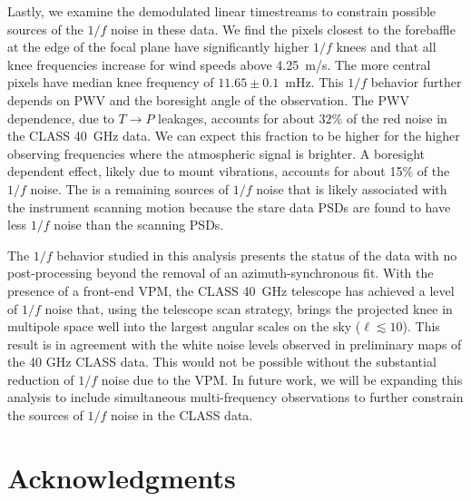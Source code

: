 \documentclass[twocolumn, tighten, numberedappendix, twocolappendix]{aastex63}
\begin{document}
Lastly, we examine the demodulated linear timestreams to constrain possible sources of the $1/f$ noise in these data. We find the pixels closest to the forebaffle at the edge of the focal plane have significantly higher $1/f$ knees and that all knee frequencies increase for wind speeds above 4.25~m/s. The more central pixels have median knee frequency of $11.65\pm0.1$~mHz. This $1/f$ behavior further depends on PWV and the boresight angle of the observation. The PWV dependence, due to $T\rightarrow P$ leakages, accounts for about $32\%$ of the red noise in the CLASS 40~GHz data. We can expect this fraction to be higher for the higher observing frequencies where the atmospheric signal is brighter. A boresight dependent effect, likely due to mount vibrations, accounts for about 15\% of the $1/f$ noise. The is a remaining sources of $1/f$ noise that is likely associated with the instrument scanning motion because the stare data PSDs are found to have less $1/f$ noise than the scanning PSDs.


The $1/f$ behavior studied in this analysis presents the status of the data with no post-processing beyond the removal of an azimuth-synchronous fit. With the presence of a front-end VPM, the CLASS 40~GHz telescope has achieved a level of $1/f$ noise that, using the telescope scan strategy, brings the projected knee in multipole space well into the largest angular scales on the sky ($\ell \lesssim10$). This result is in agreement with the white noise levels observed in preliminary maps of the 40 GHz CLASS data. This would not be possible without the substantial reduction of $1/f$ noise due to the VPM. In future work, we will be expanding this analysis to include simultaneous multi-frequency observations to further constrain the sources of $1/f$ noise in the CLASS data. 


\section*{Acknowledgments}
\vskip4pt
\end{document}
